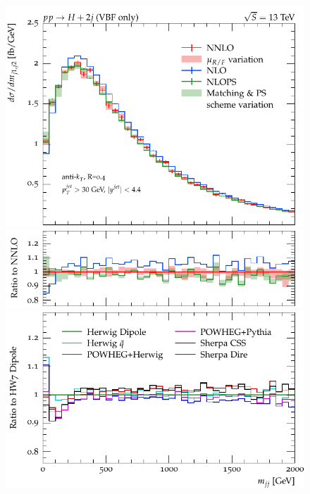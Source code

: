 \documentclass[10pt,prd,fleqn,superscriptaddress,notitlepage,nofootinbib,preprintnumbers,nobalancelastpage]{revtex4-1}
\begin{document}
\begin{figure}[tp]
  \centering
  \begin{minipage}{.32\textwidth}
    \includegraphics[width=\textwidth]{figures/tools/m_jj12.pdf}
    \includegraphics[width=\textwidth]{figures/tools/m_jj12_rFO.pdf}
    \includegraphics[width=\textwidth]{figures/tools/m_jj12_rMC.pdf}
  \end{minipage}\hfill
  \begin{minipage}{.32\textwidth}

\end{minipage}
\end{figure}
\end{document}
